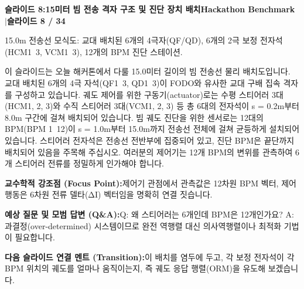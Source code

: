 \documentclass[11pt,a4paper]{article}
\begin{document}
\clearpage
\hypertarget{slide.8}{}
{}
\noindent\begin{tcolorbox}[colback=navy,colframe=navy,left=6pt,right=6pt,top=3pt,bottom=3pt,boxrule=0pt,arc=2pt]
{\large\bfseries\color{white}슬라이드 8:\enspace 15미터 빔 전송 격자 구조 및 진단 장치 배치}\hfill{\footnotesize\bfseries\color{white!85!lightbg}Hackathon Benchmark \enspace$|$\enspace 슬라이드 8 / 34}
\end{tcolorbox}
\vspace{0.2em}
\begin{tcolorbox}[colback=lightbg,colframe=bordergray,title={\footnotesize\bfseries\color{darkgray}슬라이드 시각 구성 요약},fontupper=\small,left=6pt,right=6pt,top=2.5pt,bottom=2.5pt,boxrule=0.6pt,arc=2.5pt]
15.0m 전송선 모식도: 교대 배치된 6개의 4극자(QF/QD), 6개의 2극 보정 전자석(HCM1~3, VCM1~3), 12개의 BPM 진단 스테이션.
\end{tcolorbox}
\vspace{0.2em}
\begin{tcolorbox}[colback=white,colframe=primaryblue,title={\footnotesize\bfseries\color{white}발표자 구두 대본 (Spoken Script)},fontupper=\small,left=6pt,right=6pt,top=3pt,bottom=3pt,boxrule=0.8pt,arc=2.5pt]
이 슬라이드는 오늘 해커톤에서 다룰 15.0미터 길이의 빔 전송선 물리 배치도입니다. 교대 배치된 6개의 4극 자석(QF1~3, QD1~3)이 FODO와 유사한 교대 구배 집속 격자를 구성하고 있습니다. 궤도 제어를 위한 구동기(actuator)로는 수평 스티어러 3대(HCM1, 2, 3)와 수직 스티어러 3대(VCM1, 2, 3) 등 총 6대의 전자석이 s = 0.2m부터 8.0m 구간에 걸쳐 배치되어 있습니다. 빔 궤도 진단을 위한 센서로는 12대의 BPM(BPM 1~12)이 s = 1.0m부터 15.0m까지 전송선 전체에 걸쳐 균등하게 설치되어 있습니다. 스티어러 전자석은 전송선 전반부에 집중되어 있고, 진단 BPM은 끝단까지 배치되어 있음을 주목해 주십시오. 여러분의 제어기는 12개 BPM의 변위를 관측하여 6개 스티어러 전류를 정밀하게 인가해야 합니다.
\end{tcolorbox}
\vspace{0.2em}
\begin{tcolorbox}[colback=lightbg,colframe=bordergray,left=6pt,right=6pt,top=3pt,bottom=3pt,boxrule=0.6pt,arc=2.5pt]
\small
\noindent\textbf{\color{navy}교수학적 강조점 (Focus Point):}\enspace 제어기 관점에서 관측값은 12차원 BPM 벡터, 제어 행동은 6차원 전류 델타(ΔI) 벡터임을 명확히 연결 짓습니다.\par\vspace{0.3em}
\noindent\textbf{\color{successgreen}예상 질문 및 모범 답변 (Q\&A):}\enspace Q: 왜 스티어러는 6개인데 BPM은 12개인가요? A: 과결정(over-determined) 시스템이므로 완전 역행렬 대신 의사역행렬이나 최적화 기법이 필요합니다.\par\vspace{0.3em}
\noindent\textbf{\color{accent}다음 슬라이드 연결 멘트 (Transition):}\enspace 이 배치를 염두에 두고, 각 보정 전자석이 각 BPM 위치의 궤도를 얼마나 움직이는지, 즉 궤도 응답 행렬(ORM)을 유도해 보겠습니다.
\end{tcolorbox}
\end{document}
